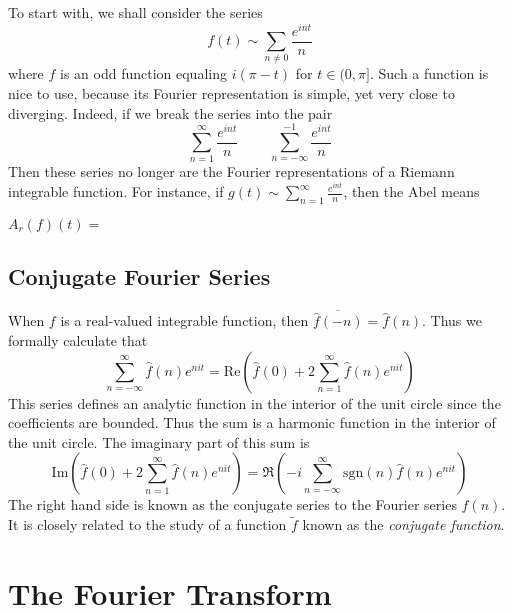 To start with, we shall consider the series
%
\[ f(t) \sim \sum_{n \neq 0} \frac{e^{int}}{n} \]
%
where $f$ is an odd function equaling $i(\pi - t)$ for $t \in (0,\pi]$. Such a function is nice to use, because its Fourier representation is simple, yet very close to diverging. Indeed, if we break the series into the pair
%
\[ \sum_{n = 1}^\infty  \frac{e^{int}}{n}\ \ \ \ \ \ \ \ \ \ \sum_{n = -\infty}^{-1} \frac{e^{int}}{n} \]
%
Then these series no longer are the Fourier representations of a Riemann integrable function. For instance, if $g(t) \sim \sum_{n = 1}^\infty \frac{e^{int}}{n}$, then the Abel means

$A_r(f)(t) = $

\section{Conjugate Fourier Series}

When $f$ is a real-valued integrable function, then $\overline{\widehat{f}(-n)} = \widehat{f}(n)$. Thus we formally calculate that
%
\[ \sum_{n = -\infty}^\infty \widehat{f}(n) e^{nit} = \text{Re} \left( \widehat{f}(0) + 2\sum_{n = 1}^\infty \widehat{f}(n) e^{nit} \right) \]
%
This series defines an analytic function in the interior of the unit circle since the coefficients are bounded. Thus the sum is a harmonic function in the interior of the unit circle. The imaginary part of this sum is
%
\[ \text{Im} \left( \widehat{f}(0) + 2\sum_{n = 1}^\infty \widehat{f}(n) e^{nit} \right) = \Re \left( -i \sum_{n = -\infty}^\infty \text{sgn}(n) \widehat{f}(n) e^{nit} \right) \]
%
The right hand side is known as the conjugate series to the Fourier series $\widehat{f}(n)$. It is closely related to the study of a function $\tilde{f}$ known as the {\it conjugate function}.

\chapter{The Fourier Transform}

